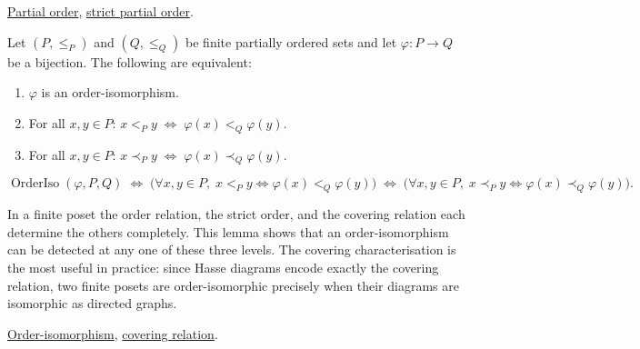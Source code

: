 \begin{remark*}[Dependencies]
\hyperref[def:lattice-order-partial-order]{Partial order},
\hyperref[def:lattice-order-strict-partial-order]{strict partial order}.
\end{remark*}


\begin{lemma}
\label{lem:order-iso-finite-characterizations}
Let $(P, \leq_P)$ and $(Q, \leq_Q)$ be finite partially ordered sets and
let $\varphi : P \to Q$ be a bijection.  The following are equivalent:
\begin{enumerate}
  \item $\varphi$ is an order-isomorphism.
  \item For all $x, y \in P$:\; $x <_P y \;\Longleftrightarrow\; \varphi(x) <_Q \varphi(y)$.
  \item For all $x, y \in P$:\; $x \prec_P y \;\Longleftrightarrow\; \varphi(x) \prec_Q \varphi(y)$.
\end{enumerate}
\end{lemma}

\begin{remark*}
\[
\operatorname{OrderIso}(\varphi, P, Q)
\;\Longleftrightarrow\;
\bigl(\forall x,y \in P,\; x <_P y \Leftrightarrow \varphi(x) <_Q \varphi(y)\bigr)
\;\Longleftrightarrow\;
\bigl(\forall x,y \in P,\; x \prec_P y \Leftrightarrow \varphi(x) \prec_Q \varphi(y)\bigr).
\]
\end{remark*}

\begin{remark*}[Interpretation]
In a finite poset the order relation, the strict order, and the covering
relation each determine the others completely.  This lemma shows that an
order-isomorphism can be detected at any one of these three levels.  The
covering characterisation is the most useful in practice: since Hasse
diagrams encode exactly the covering relation, two finite posets are
order-isomorphic precisely when their diagrams are isomorphic as directed
graphs.
\end{remark*}

\begin{remark*}[Dependencies]
\hyperref[def:order-isomorphism]{Order-isomorphism},
\hyperref[def:covering-relation]{covering relation}.
\end{remark*}


